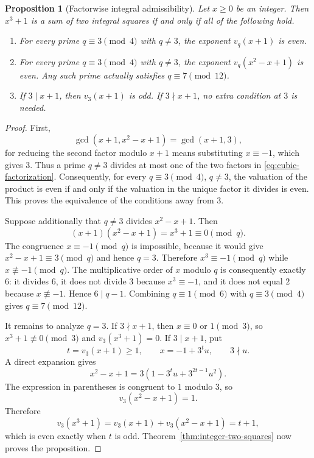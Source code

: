 \documentclass[11pt,a4paper]{article}
\numberwithin{equation}{section}
\newtheorem{proposition}[theorem]{Proposition}
\theoremstyle{definition}
\begin{document}
\begin{proposition}[Factorwise integral admissibility]
\label{prop:factorwise}
Let $x\ge0$ be an integer. Then $x^3+1$ is a sum of two integral squares if and only if all of the following hold.
\begin{enumerate}
\item For every prime $q\equiv3\pmod4$ with $q\ne3$, the exponent $v_q(x+1)$ is even.
\item For every prime $q\equiv3\pmod4$ with $q\ne3$, the exponent $v_q(x^2-x+1)$ is even. Any such prime actually satisfies $q\equiv7\pmod{12}$.
\item If $3\mid x+1$, then $v_3(x+1)$ is odd. If $3\nmid x+1$, no extra condition at $3$ is needed.
\end{enumerate}
\end{proposition}

\begin{proof}
First,
\begin{equation}
 \gcd(x+1,x^2-x+1)=\gcd(x+1,3),
 \label{eq:gcd-two-factors}
\end{equation}
for reducing the second factor modulo $x+1$ means substituting $x\equiv-1$, which gives $3$. Thus a prime $q\ne3$ divides at most one of the two factors in \eqref{eq:cubic-factorization}. Consequently, for every $q\equiv3\pmod4$, $q\ne3$, the valuation of the product is even if and only if the valuation in the unique factor it divides is even. This proves the equivalence of the conditions away from $3$.

Suppose additionally that $q\ne3$ divides $x^2-x+1$. Then
\[
 (x+1)(x^2-x+1)=x^3+1\equiv0\pmod q.
\]
The congruence $x\equiv-1\pmod q$ is impossible, because it would give
$x^2-x+1\equiv3\pmod q$ and hence $q=3$. Therefore $x^3\equiv-1\pmod q$ while $x\not\equiv-1\pmod q$. The multiplicative order of $x$ modulo $q$ is consequently exactly $6$: it divides $6$, it does not divide $3$ because $x^3\equiv-1$, and it does not equal $2$ because $x\not\equiv-1$. Hence $6\mid q-1$. Combining $q\equiv1\pmod6$ with $q\equiv3\pmod4$ gives $q\equiv7\pmod{12}$.

It remains to analyze $q=3$. If $3\nmid x+1$, then $x\equiv0$ or $1\pmod3$, so $x^3+1\not\equiv0\pmod3$ and $v_3(x^3+1)=0$. If $3\mid x+1$, put
\[
 t=v_3(x+1)\ge1,
 \qquad
 x=-1+3^t u,
 \qquad
 3\nmid u.
\]
A direct expansion gives
\[
 x^2-x+1
 =3\left(1-3^tu+3^{2t-1}u^2\right).
\]
The expression in parentheses is congruent to $1$ modulo $3$, so
\[
 v_3(x^2-x+1)=1.
\]
Therefore
\[
 v_3(x^3+1)=v_3(x+1)+v_3(x^2-x+1)=t+1,
\]
which is even exactly when $t$ is odd. Theorem~\ref{thm:integer-two-squares} now proves the proposition.
\end{proof}
\end{document}
